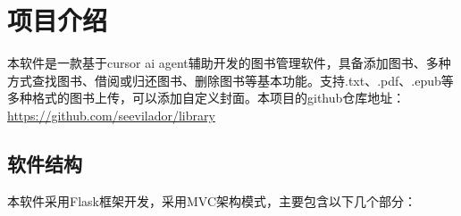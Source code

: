\documentclass{SYSUReport}
\date{\today}
\begin{document}
\cover
\thispagestyle{empty} %
\clearpage

%
%


\setcounter{page}{1}
\tableofcontents
\clearpage

\setcounter{page}{1}


\section{项目介绍}
本软件是一款基于cursor ai agent辅助开发的图书管理软件，具备添加图书、多种方式查找图书、借阅或归还图书、删除图书等基本功能。支持.txt、.pdf、.epub等多种格式的图书上传，可以添加自定义封面。本项目的github仓库地址：\url{https://github.com/seevilador/library}

\subsection{软件结构}
本软件采用Flask框架开发，采用MVC架构模式，主要包含以下几个部分：
\end{document}
